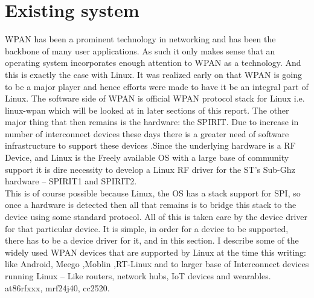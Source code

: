 \section{Existing system}
\noindent WPAN has been a prominent technology in networking and has been the backbone of many user applications. As such it only makes sense that an operating system incorporates enough attention to WPAN as a technology. And this is exactly the case with Linux. It was realized early on that WPAN is going to be a major player and hence efforts were made to have it be an integral part of Linux. The software side of WPAN is official WPAN protocol stack for Linux i.e. linux-wpan which will be looked at in later sections of this report. The other major thing that then remains is the hardware: the SPIRIT. Due to increase in number of interconnect devices these days there is a greater need of software infrastructure to support these devices .Since the underlying hardware is a RF Device, and Linux is the Freely available OS with a large base of community support it is dire necessity to develop a Linux RF driver for the ST’s Sub-Ghz hardware – SPIRIT1 and SPIRIT2.\\
\noindent This is of course possible because Linux, the OS has a stack support for SPI, so once a hardware is detected then all that remains is to bridge this stack to the device using some standard protocol. All of this is taken care by the device driver for that particular device. It is simple, in order for a device to be supported, there has to be a device driver for it, and in this section. I describe some of the widely used WPAN devices that are supported by Linux at the time this writing:\\
like Android, Meego ,Moblin ,RT-Linux and to larger base of Interconnect devices running Linux – Like routers, network hubs, IoT devices and wearables. at86rfxxx, mrf24j40, cc2520.
